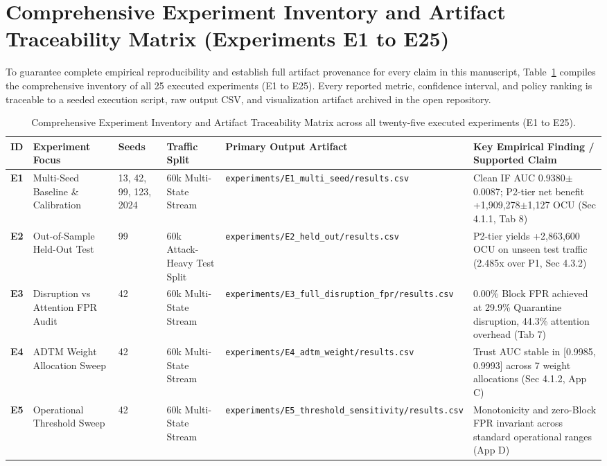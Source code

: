 \section{Comprehensive Experiment Inventory and Artifact Traceability Matrix (Experiments E1 to E25)}
\label{app:inventory}

To guarantee complete empirical reproducibility and establish full artifact provenance for every claim in this manuscript, Table~\ref{tab:experiment_inventory} compiles the comprehensive inventory of all 25 executed experiments (E1 to E25). Every reported metric, confidence interval, and policy ranking is traceable to a seeded execution script, raw output CSV, and visualization artifact archived in the open repository.

\begin{table}[t]
\caption{Comprehensive Experiment Inventory and Artifact Traceability Matrix across all twenty-five executed experiments (E1 to E25).}
\label{tab:experiment_inventory}
\centering
\scriptsize
\begin{tabular}{lp{2.8cm}p{1.8cm}p{2.6cm}p{3.8cm}p{4.2cm}}
\toprule
\textbf{ID} & \textbf{Experiment Focus} & \textbf{Seeds} & \textbf{Traffic Split} & \textbf{Primary Output Artifact} & \textbf{Key Empirical Finding / Supported Claim} \\
\midrule
\textbf{E1} & Multi-Seed Baseline \& Calibration & 13, 42, 99, 123, 2024 & 60k Multi-State Stream & \texttt{experiments/E1\_multi\_seed/results.csv} & Clean IF AUC 0.9380$\pm$0.0087; P2-tier net benefit +1,909,278$\pm$1,127 OCU (Sec 4.1.1, Tab 8) \\
\textbf{E2} & Out-of-Sample Held-Out Test & 99 & 60k Attack-Heavy Test Split & \texttt{experiments/E2\_held\_out/results.csv} & P2-tier yields +2,863,600 OCU on unseen test traffic (2.485x over P1, Sec 4.3.2) \\
\textbf{E3} & Disruption vs Attention FPR Audit & 42 & 60k Multi-State Stream & \texttt{experiments/E3\_full\_disruption\_fpr/results.csv} & 0.00\% Block FPR achieved at 29.9\% Quarantine disruption, 44.3\% attention overhead (Tab 7) \\
\textbf{E4} & ADTM Weight Allocation Sweep & 42 & 60k Multi-State Stream & \texttt{experiments/E4\_adtm\_weight/results.csv} & Trust AUC stable in [0.9985, 0.9993] across 7 weight allocations (Sec 4.1.2, App C) \\
\textbf{E5} & Operational Threshold Sweep & 42 & 60k Multi-State Stream & \texttt{experiments/E5\_threshold\_sensitivity/results.csv} & Monotonicity and zero-Block FPR invariant across standard operational ranges (App D) \\

\end{tabular}
\end{table}
